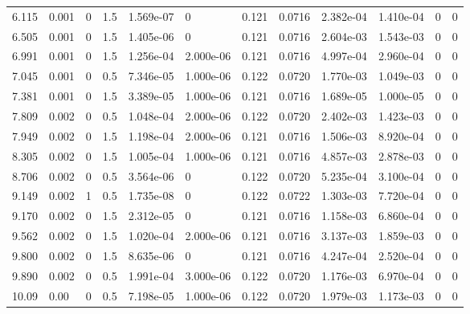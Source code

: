\documentclass[preview]{standalone}
\begin{document}
{{\begin{tabular}{L{1.2cm}C{1.2cm} C{0.3cm}C{0.5cm} C{1.4cm}C{1.4cm} C{1.4cm}C{1.4cm} C{1.6cm}C{1.6cm} C{1.6cm}C{1.6cm}}
  6.115  &  0.001  & 0     & 1.5 &  1.569e-07  & 0  &  0.121&   0.0716& 2.382e-04 & 1.410e-04   &  0 & 0  \\ 
  6.505  &  0.001  & 0     & 1.5 &  1.405e-06  & 0  &  0.121&   0.0716& 2.604e-03 & 1.543e-03   &  0 & 0  \\ 
  6.991  &  0.001  & 0     & 1.5 &  1.256e-04  & 2.000e-06  &  0.121&   0.0716& 4.997e-04 & 2.960e-04   &  0 & 0  \\ 
  7.045  &  0.001  & 0     & 0.5 &  7.346e-05  & 1.000e-06  &  0.122&   0.0720& 1.770e-03 & 1.049e-03   &  0 & 0  \\ 
  7.381  &  0.001  & 0     & 1.5 &  3.389e-05  & 1.000e-06  &  0.121&   0.0716& 1.689e-05 & 1.000e-05   &  0 & 0  \\ 
  7.809  &  0.002  & 0     & 0.5 &  1.048e-04  & 2.000e-06  &  0.122&   0.0720& 2.402e-03 & 1.423e-03   &  0 & 0  \\ 
  7.949  &  0.002  & 0     & 1.5 &  1.198e-04  & 2.000e-06  &  0.121&   0.0716& 1.506e-03 & 8.920e-04   &  0 & 0  \\ 
  8.305  &  0.002  & 0     & 1.5 &  1.005e-04  & 1.000e-06  &  0.121&   0.0716& 4.857e-03 & 2.878e-03   &  0 & 0  \\ 
  8.706  &  0.002  & 0     & 0.5 &  3.564e-06  & 0  &  0.122&   0.0720& 5.235e-04 & 3.100e-04   &  0 & 0  \\ 
  9.149  &  0.002  & 1     & 0.5 &  1.735e-08  & 0  &  0.122&   0.0722& 1.303e-03 & 7.720e-04   &  0 & 0  \\ 
  9.170  &  0.002  & 0     & 1.5 &  2.312e-05  & 0  &  0.121&   0.0716& 1.158e-03 & 6.860e-04   &  0 & 0  \\ 
  9.562  &  0.002  & 0     & 1.5 &  1.020e-04  & 2.000e-06  &  0.121&   0.0716& 3.137e-03 & 1.859e-03   &  0 & 0  \\ 
  9.800  &  0.002  & 0     & 1.5 &  8.635e-06  & 0  &  0.121&   0.0716& 4.247e-04 & 2.520e-04   &  0 & 0  \\ 
  9.890  &  0.002  & 0     & 0.5 &  1.991e-04  & 3.000e-06  &  0.122&   0.0720& 1.176e-03 & 6.970e-04   &  0 & 0  \\ 
  10.09  &  0.00  & 0     & 0.5 &  7.198e-05  & 1.000e-06  &  0.122&   0.0720& 1.979e-03 & 1.173e-03   &  0 & 0  \\ 
\hline 
\end{tabular} 

}}
\end{document}

